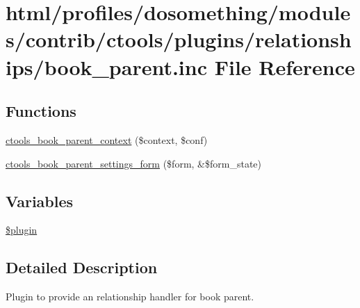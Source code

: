 \hypertarget{book__parent_8inc}{
\section{html/profiles/dosomething/modules/contrib/ctools/plugins/relationships/book\_\-parent.inc File Reference}
\label{book__parent_8inc}
}
\subsection*{Functions}
\begin{DoxyCompactItemize}
\item 
\hyperlink{book__parent_8inc_aafe432d7265404f9b92bf1d944f89c07}{ctools\_\-book\_\-parent\_\-context} (\$context, \$conf)
\item 
\hyperlink{book__parent_8inc_a493e0b362b43e7e8f47809e9c865077d}{ctools\_\-book\_\-parent\_\-settings\_\-form} (\$form, \&\$form\_\-state)
\end{DoxyCompactItemize}
\subsection*{Variables}
\begin{DoxyCompactItemize}
\item 
\hyperlink{book__parent_8inc_ada8a7130088351710bb02ed622d6bf65}{\$plugin}
\end{DoxyCompactItemize}


\subsection{Detailed Description}
Plugin to provide an relationship handler for book parent. 

